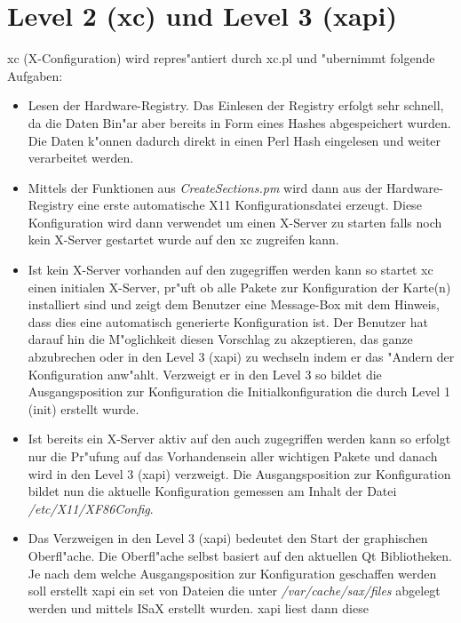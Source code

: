 \section{Level 2 (xc) und Level 3 (xapi)}
\label{sec:le2}
xc (X-Configuration) wird repres"antiert durch xc.pl und 
"ubernimmt folgende Aufgaben:
\begin{itemize}
\item Lesen der Hardware-Registry. Das Einlesen der Registry
      erfolgt sehr schnell, da die Daten Bin"ar aber bereits 
      in Form eines Hashes abgespeichert wurden. Die Daten 
      k"onnen dadurch direkt in einen Perl Hash eingelesen und
      weiter verarbeitet werden.
\item Mittels der Funktionen aus \textit{CreateSections.pm} 
      wird dann aus der Hardware-Registry eine erste automatische 
      X11 Konfigurationsdatei erzeugt. Diese Konfiguration wird
      dann verwendet um einen X-Server zu starten falls noch kein
      X-Server gestartet wurde auf den xc zugreifen kann.
\item Ist kein X-Server vorhanden auf den zugegriffen werden kann
      so startet xc einen initialen X-Server, pr"uft ob alle Pakete
      zur Konfiguration der Karte(n) installiert sind und zeigt dem 
      Benutzer eine Message-Box mit dem Hinweis, dass dies eine automatisch
      generierte Konfiguration ist. Der Benutzer hat darauf hin die
      M"oglichkeit diesen Vorschlag zu akzeptieren, das ganze
      abzubrechen oder in den Level 3 (xapi) zu wechseln indem
      er das "Andern der Konfiguration anw"ahlt. Verzweigt er in 
      den Level 3 so bildet die Ausgangsposition zur Konfiguration
      die Initialkonfiguration die durch Level 1 (init) erstellt 
      wurde.
\item Ist bereits ein X-Server aktiv auf den auch zugegriffen werden
      kann so erfolgt nur die Pr"ufung auf das Vorhandensein aller
      wichtigen Pakete und danach wird in den Level 3 (xapi)
      verzweigt. Die Ausgangsposition zur Konfiguration bildet nun
      die aktuelle Konfiguration gemessen am Inhalt der Datei
      \textit{/etc/X11/XF86Config}.
\item Das Verzweigen in den Level 3 (xapi) bedeutet den Start der 
      graphischen Oberfl"ache. Die Oberfl"ache selbst basiert auf
      den aktuellen Qt Bibliotheken. Je nach dem welche Ausgangsposition
      zur Konfiguration geschaffen werden soll erstellt xapi ein
      set von Dateien die unter \textit{/var/cache/sax/files} abgelegt
      werden und mittels ISaX erstellt wurden. xapi liest dann diese

\end{itemize}
